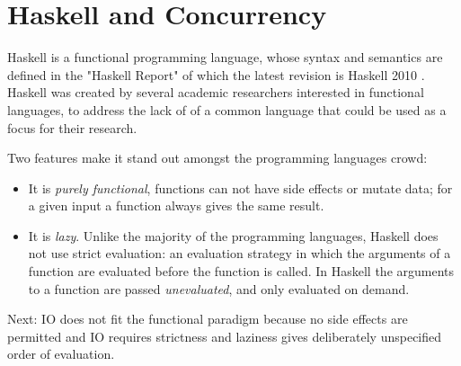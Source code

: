 
\chapter{Haskell and Concurrency}

Haskell is a functional programming language, whose syntax and semantics are defined in the "Haskell Report" of which the latest revision is Haskell 2010 \cite{Marlow_haskell2010}. Haskell was created by several academic researchers interested in functional languages, to address the lack of of a common language that could be used as a focus for their research.

Two features make it stand out amongst the programming languages crowd:
\begin{itemize}
\item It is \emph{purely functional}, \ie functions can not have side effects or mutate data; for a given input a function always gives the same result.
\item It is \emph{lazy}. Unlike the majority of the programming languages, Haskell does not use strict evaluation: an evaluation strategy in which the arguments of a function are evaluated before the function is called. In Haskell the arguments to a function are passed \emph{unevaluated}, and only evaluated on demand.
\end{itemize}

Next: IO does not fit the functional paradigm because no side effects are permitted and IO requires strictness and laziness gives deliberately unspecified order of evaluation. \cite{PeytonJones:1993:IFP:158511.158524}








